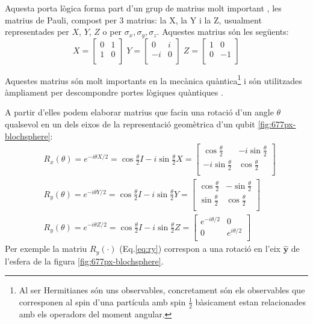 Aquesta porta lògica forma part d'un grup de matrius molt important , les matrius de Pauli, compost  per 3 matrius: la X, la Y i la Z, usualment representades per $X$, $Y$, $Z$ o per $\sigma_x, \sigma_y, \sigma_z$. Aquestes matrius són les següents:
$$
	 X = \begin{bmatrix} 0 & 1\\ 1 & 0\\ \end{bmatrix} \; Y = \begin{bmatrix} 0 & i\\ -i & 0\\ \end{bmatrix} \; Z = \begin{bmatrix} 1 & 0\\ 0 & -1\\ \end{bmatrix} 
$$

Aquestes matrius són molt importants en la mecànica quàntica\footnote{Al ser Hermitianes són uns observables, concretament són els observables que corresponen al spin d'una partícula amb spin $\frac{1}{2}$ bàsicament estan relacionades amb els operadors del moment angular.} i són utilitzades àmpliament per descompondre portes lògiques quàntiques \cite{QCandQI:density_matrix}.

A partir d'elles podem elaborar matrius que facin una rotació d'un angle $\theta$ qualsevol en un dels eixos de la representació geomètrica d'un qubit \ref{fig:677px-blochsphere}:
\begin{align}
	& R_x(\theta) =  e^{-i\theta X/2} = \cos \frac{\theta}{2}I -i \sin \frac{\theta}{2}X = 
	\begin{bmatrix}
		\cos \frac{\theta}{2} & -i \sin \frac{\theta}{2} \\
		-i\sin \frac{\theta}{2} & \cos\frac{\theta}{2} \\
	\end{bmatrix} \label{eq:rx}\\
	& R_y(\theta) =  e^{-i\theta Y/2} = \cos \frac{\theta}{2}I -i \sin \frac{\theta}{2}Y = 
	\begin{bmatrix}
		\cos \frac{\theta}{2} & -\sin \frac{\theta}{2} \\
		\sin \frac{\theta}{2} & \cos\frac{\theta}{2} \\
	\end{bmatrix} \label{eq:ry}\\
	& R_y(\theta) =  e^{-i\theta Z/2} = \cos \frac{\theta}{2}I -i \sin \frac{\theta}{2}Z = 
	\begin{bmatrix}
		e^{-i\theta/2} & 0 \\
		0 & e^{i\theta/2} \\
	\end{bmatrix} \label{eq:rz}
\end{align}
Per exemple la matriu $R_y(\cdot)$ (Eq.\ref{eq:ry}) correspon a una rotació en l'eix $\hat{\mathbf{y}}$ de l'esfera de la figura \ref{fig:677px-blochsphere}.

